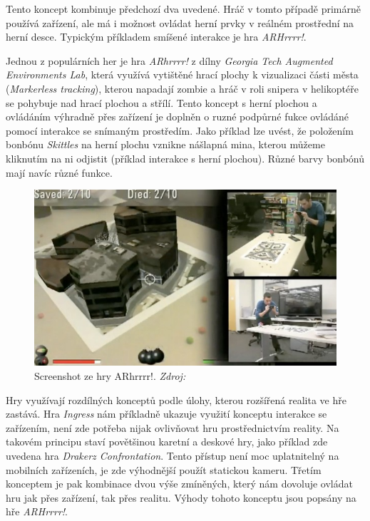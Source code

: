 \documentclass[twoside,12pt]{article}
\begin{document}
Tento koncept kombinuje předchozí dva uvedené. Hráč v tomto případě primárně používá zařízení, ale má i možnost ovládat herní prvky v reálném prostřední na herní desce. Typickým příkladem smíšené interakce je hra \textit{ARHrrrr!}.

% 
Jednou z populárních her je hra \textit{ARhrrrr!} z dílny \textit{Georgia Tech Augmented Environments Lab}, která využívá vytištěné hrací plochy k vizualizaci části města (\textit{Markerless tracking}), kterou napadají zombie a hráč v roli snipera v helikoptéře se pohybuje nad hrací plochou a střílí. Tento koncept s herní plochou a ovládáním výhradně přes zařízení je doplněn o ruzné podpůrné fukce ovládáné pomocí interakce se snímaným prostředím. Jako příklad lze uvést, že položením bonbónu \textit{Skittles} na herní plochu vznikne nášlapná mina, kterou můžeme kliknutím na ni odjistit (příklad interakce s herní plochou). Různé barvy bonbónů mají navíc různé funkce.

\begin{figure}[H]
    \includegraphics[width=424px, center]{images/arhrrrr.jpg}
    \caption[]{Screenshot ze hry ARhrrrr!. \textit{Zdroj: \cite{arhrrrr_screenshot}}}
    \label{arhrrrr_screenshot}
\end{figure}

Hry využívají rozdílných konceptů podle úlohy, kterou rozšířená realita ve hře zastává. Hra \textit{Ingress} nám příkladně ukazuje využití konceptu interakce se zařízením, není zde potřeba nijak ovlivňovat hru prostřednictvím reality. Na takovém principu staví povětšinou karetní a deskové hry, jako příklad zde uvedena hra \textit{Drakerz Confrontation}. Tento přístup není moc uplatnitelný na mobilních zařízeních, je zde výhodnější použít statickou kameru. Třetím konceptem je pak kombinace dvou výše zmíněných, který nám dovoluje ovládat hru jak přes zařízení, tak přes realitu. Výhody tohoto konceptu jsou popsány na hře \textit{ARHrrrr!}.
\end{document}
